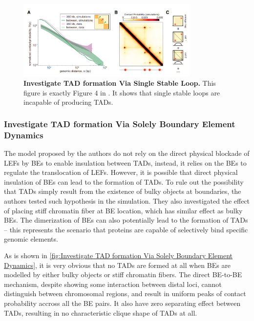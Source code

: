 \documentclass[11pt]{article}
\begin{document}
\begin{figure}[htbp]
  \centering
  \includegraphics[width=0.8\textwidth]{assets/Snipaste_2023-01-13_18-37-34.png}
  \caption{\textbf{Investigate TAD formation Via Single Stable Loop.} This figure is exactly Figure 4 in \cite{fudenberg_formation_2016}. It shows that single stable loops are incapable of producing TADs.}
  \label{fig:Investigate TAD formation Via Single Stable Loop}
\end{figure}

\subsubsection*{Investigate TAD formation Via Solely Boundary Element Dynamics}

The model proposed by the authors do not rely on the direct physical blockade of LEFs by BEs to enable insulation between TADs, instead, it relies on the BEs to regulate the translocation of LEFs. However, it is possible that direct physical insulation of BEs can lead to the formation of TADs. To rule out the possibility that TADs simply result from the existence of bulky objects at boundaries, the authors tested such hypothesis in the simulation. They also investigated the effect of placing stiff chromatin fiber at BE location, which has similar effect as bulky BEs. The dimerization of BEs can also potentially lead to the formation of TADs -- this represents the scenario that proteins are capable of selectively bind specific genomic elements.

As is shown in \cref{fig:Investigate TAD formation Via Solely Boundary Element Dynamics}, it is very obvious that no TADs are formed at all when BEs are modelled by either bulky objects or stiff chromatin fibers. The direct BE-to-BE mechanism, despite showing some interaction between distal loci, cannot distinguish between chromosomal regions, and result in uniform peaks of contact probability accross all the BE pairs. It also have zero separating effect between TADs, resulting in no characteristic clique shape of TADs at all.
\end{document}
